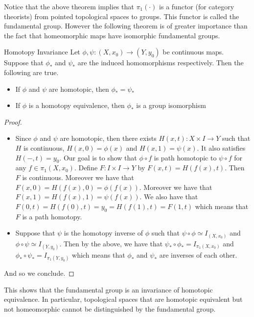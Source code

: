 \documentclass[a4paper]{article}
\begin{document}
Notice that the above theorem implies that $\pi_1(\cdot)$ is a functor (for category theorists) from pointed topological spaces to groups. This functor is called the fundamental group. However the following theorem is of greater importance than the fact that homeomorphic maps have isomorphic fundamental groups. 

\begin{thm}{Homotopy Invariance}{} Let $\phi,\psi:(X,x_0)\to(Y,y_0)$ be continuous maps. Suppose that $\phi_\ast$ and $\psi_\ast$ are the induced homomorphisms respectively. Then the following are true. 
\begin{itemize}
\item If $\phi$ and $\psi$ are homotopic, then $\phi_\ast=\psi_\ast$
\item If $\phi$ is a homotopy equivalence, then $\phi_\ast$ is a group isomorphism
\end{itemize} 
\begin{proof}~\\
\begin{itemize}
\item Since $\phi$ and $\psi$ are homotopic, then there exists $H(x,t):X\times I\to Y$ such that $H$ is continuous, $H(x,0)=\phi(x)$ and $H(x,1)=\psi(x)$. It also satisfies $H(-,t)=y_0$. Our goal is to show that $\phi\circ f$ is path homotopic to $\psi\circ f$ for any $f\in\pi_1(X,x_0)$. Define $F:I\times I\to Y$ by $F(x,t)=H(f(x),t)$. Then $F$ is continuous. Moreover we have that $F(x,0)=H(f(x),0)=\phi(f(x))$. Moreover we have that $F(x,1)=H(f(x),1)=\psi(f(x))$. We also have that $F(0,t)=H(f(0),t)=y_0=H(f(1),t)=F(1,t)$ which means that $F$ is a path homotopy. 
\item Suppose that $\psi$ is the homotopy inverse of $\phi$ such that $\psi\circ\phi\simeq I_{(X,x_0)}$ and $\phi\circ\psi\simeq I_{(Y,y_0)}$. Then by the above, we have that $\psi_\ast\circ\phi_\ast=I_{\pi_1(X,x_0)}$ and $\phi_\ast\circ\psi_\ast=I_{\pi_1(Y,y_0)}$ which means that $\phi_\ast$ and $\psi_\ast$ are inverses of each other. 
\end{itemize}
And so we conclude. 
\end{proof}
\end{thm}

This shows that the fundamental group is an invariance of homotopic equivalence. In particular, topological spaces that are homotopic equivalent but not homeomorphic cannot be distinguished by the fundamental group. \\
\end{document}
